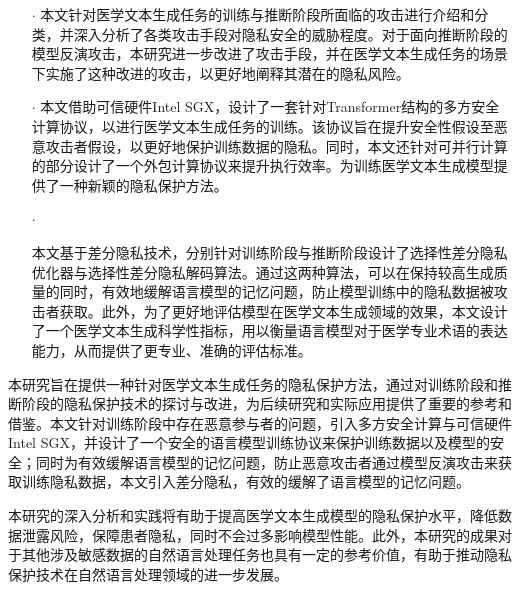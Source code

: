 \begin{itemize}
	\item [$\cdot$]
	本文针对医学文本生成任务的训练与推断阶段所面临的攻击进行介绍和分类，并深入分析了各类攻击手段对隐私安全的威胁程度。对于面向推断阶段的模型反演攻击，本研究进一步改进了攻击手段，并在医学文本生成任务的场景下实施了这种改进的攻击，以更好地阐释其潜在的隐私风险。
	\item [$\cdot$]
	本文借助可信硬件Intel SGX，设计了一套针对Transformer结构的多方安全计算协议，以进行医学文本生成任务的训练。该协议旨在提升安全性假设至恶意攻击者假设，以更好地保护训练数据的隐私。同时，本文还针对可并行计算的部分设计了一个外包计算协议来提升执行效率。为训练医学文本生成模型提供了一种新颖的隐私保护方法。
	
	\item [$\cdot$]
	
	本文基于差分隐私技术，分别针对训练阶段与推断阶段设计了选择性差分隐私优化器与选择性差分隐私解码算法。通过这两种算法，可以在保持较高生成质量的同时，有效地缓解语言模型的记忆问题，防止模型训练中的隐私数据被攻击者获取。此外，为了更好地评估模型在医学文本生成领域的效果，本文设计了一个医学文本生成科学性指标，用以衡量语言模型对于医学专业术语的表达能力，从而提供了更专业、准确的评估标准。
	
\end{itemize}

本研究旨在提供一种针对医学文本生成任务的隐私保护方法，通过对训练阶段和推断阶段的隐私保护技术的探讨与改进，为后续研究和实际应用提供了重要的参考和借鉴。本文针对训练阶段中存在恶意参与者的问题，引入多方安全计算与可信硬件 Intel SGX，并设计了一个安全的语言模型训练协议来保护训练数据以及模型的安全；同时为有效缓解语言模型的记忆问题，防止恶意攻击者通过模型反演攻击来获取训练隐私数据，本文引入差分隐私，有效的缓解了语言模型的记忆问题。

本研究的深入分析和实践将有助于提高医学文本生成模型的隐私保护水平，降低数据泄露风险，保障患者隐私，同时不会过多影响模型性能。此外，本研究的成果对于其他涉及敏感数据的自然语言处理任务也具有一定的参考价值，有助于推动隐私保护技术在自然语言处理领域的进一步发展。

